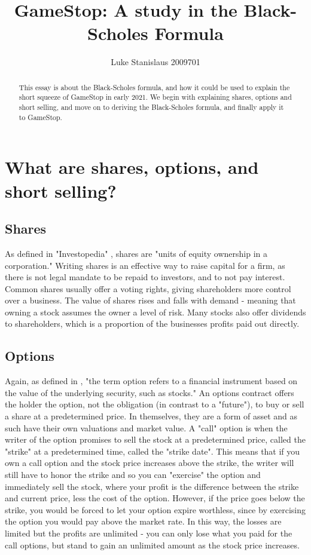 \documentclass[11pt]{article} %
\title{GameStop: A study in the Black-Scholes Formula}
\author{Luke Stanislaus 2009701}
\begin{document}
\maketitle

\begin{abstract}
    This essay is about the Black-Scholes formula, and how it could be 
    used to explain the short squeeze of GameStop in early 2021. We begin 
    with explaining shares, options and short selling, and move on to 
    deriving the Black-Scholes formula, and finally apply it to GameStop.
    \end{abstract}



\section{What are shares, options, and short selling?}
\subsection{Shares}
As defined in "Investopedia" \cite{shares}, shares are "units of equity 
ownership in a corporation." Writing shares is an effective way to raise 
capital for a firm, as there is not legal mandate to be repaid to 
investors, and to not pay interest. Common shares usually offer a voting 
rights, giving shareholders more control over a business. The value of 
shares rises and falls with demand - meaning that owning a stock assumes 
the owner a level of risk. Many stocks also offer dividends to 
shareholders, which is a proportion of the businesses profits paid out 
directly.
\subsection{Options}
Again, as defined in \cite{options}, "the term option refers to a 
financial instrument based on the value of the underlying security, 
such as stocks." An options contract offers the holder the option, 
not the obligation (in contrast to a "future"), to buy or sell a share 
at a predetermined price. In themselves, they are a form of asset and 
as such have their own valuations and market value. A "call" option 
is when the writer of the option promises to sell the stock at a 
predetermined price, called the "strike" at a predetermined time, 
called the "strike date". This means that if you own a call option and 
the stock price increases above the strike, the writer will still have 
to honor the strike and so you can "exercise" the option 
and immediately sell the stock, where your profit is the difference 
between the strike and current price, less the cost of the option. 
However, if the price goes below the strike, you would be forced 
to let your option expire worthless, since by exercising the option 
you would pay above the market rate. In this way, the losses are limited 
but the profits are unlimited - you can only lose what you paid for the 
call options, but stand to gain an unlimited amount as the stock price 
increases. 
\end{document}

